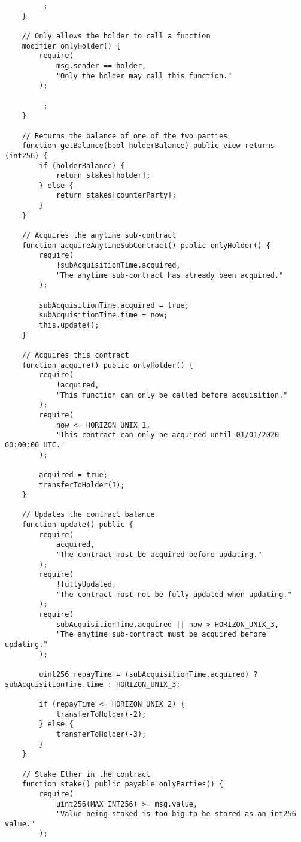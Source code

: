 \begin{lstlisting}
        _;
    }

    // Only allows the holder to call a function
    modifier onlyHolder() {
        require(
            msg.sender == holder,
            "Only the holder may call this function."
        );

        _;
    }

    // Returns the balance of one of the two parties
    function getBalance(bool holderBalance) public view returns (int256) {
        if (holderBalance) {
            return stakes[holder];
        } else {
            return stakes[counterParty];
        }
    }

    // Acquires the anytime sub-contract
    function acquireAnytimeSubContract() public onlyHolder() {
        require(
            !subAcquisitionTime.acquired,
            "The anytime sub-contract has already been acquired."
        );

        subAcquisitionTime.acquired = true;
        subAcquisitionTime.time = now;
        this.update();
    }

    // Acquires this contract
    function acquire() public onlyHolder() {
        require(
            !acquired,
            "This function can only be called before acquisition."
        );
        require(
            now <= HORIZON_UNIX_1,
            "This contract can only be acquired until 01/01/2020 00:00:00 UTC."
        );

        acquired = true;
        transferToHolder(1);
    }

    // Updates the contract balance
    function update() public {
        require(
            acquired,
            "The contract must be acquired before updating."
        );
        require(
            !fullyUpdated,
            "The contract must not be fully-updated when updating."
        );
        require(
            subAcquisitionTime.acquired || now > HORIZON_UNIX_3,
            "The anytime sub-contract must be acquired before updating."
        );

        uint256 repayTime = (subAcquisitionTime.acquired) ? subAcquisitionTime.time : HORIZON_UNIX_3;

        if (repayTime <= HORIZON_UNIX_2) {
            transferToHolder(-2);
        } else {
            transferToHolder(-3);
        }
    }

    // Stake Ether in the contract
    function stake() public payable onlyParties() {
        require(
            uint256(MAX_INT256) >= msg.value,
            "Value being staked is too big to be stored as an int256 value."
        );


\end{lstlisting}
